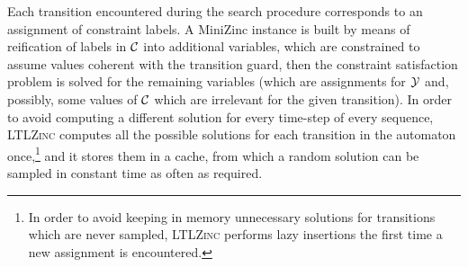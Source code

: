 Each transition encountered during the search procedure corresponds to an assignment of constraint labels. A MiniZinc instance is built by means of reification of labels in ${\mathcal{C}}$ into additional variables, which are constrained to assume values coherent with the transition guard, then the constraint satisfaction problem is solved for the remaining variables (which are assignments for ${\mathcal{Y}}$ and, possibly, some values of ${\mathcal{C}}$ which are irrelevant for the given transition). In order to avoid computing a different solution for every time-step of every sequence, \textsc{LTLZinc} computes all the possible solutions for each transition in the automaton once,\footnote{In order to avoid keeping in memory unnecessary solutions for transitions which are never sampled, \textsc{LTLZinc} performs lazy insertions the first time a new assignment is encountered.} and it stores them in a cache, from which a random solution can be sampled in constant time as often as required.


